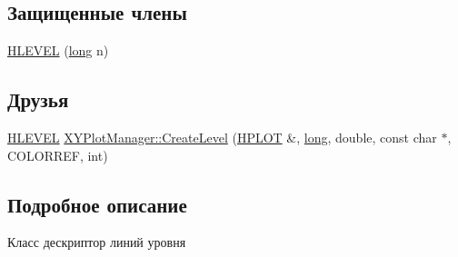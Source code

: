 \subsection*{Защищенные члены}
\begin{DoxyCompactItemize}
\item 
\hyperlink{classxyplot_1_1_h_l_e_v_e_l_a575be341f182a5ace579b6ee079ae3fd}{H\-L\-E\-V\-E\-L} (\hyperlink{namespacexyplot_a27bc71b0bdfac09495e7e531d8a918c5}{long} n)
\end{DoxyCompactItemize}
\subsection*{Друзья}
\begin{DoxyCompactItemize}
\item 
\hyperlink{classxyplot_1_1_h_l_e_v_e_l}{H\-L\-E\-V\-E\-L} \hyperlink{classxyplot_1_1_h_l_e_v_e_l_af7f77d4596fc57ef8f51f4dba0fd1c97}{X\-Y\-Plot\-Manager\-::\-Create\-Level} (\hyperlink{classxyplot_1_1_h_p_l_o_t}{H\-P\-L\-O\-T} \&, \hyperlink{namespacexyplot_a27bc71b0bdfac09495e7e531d8a918c5}{long}, double, const char $\ast$, C\-O\-L\-O\-R\-R\-E\-F, int)
\end{DoxyCompactItemize}


\subsection{Подробное описание}
Класс дескриптор линий уровня 


